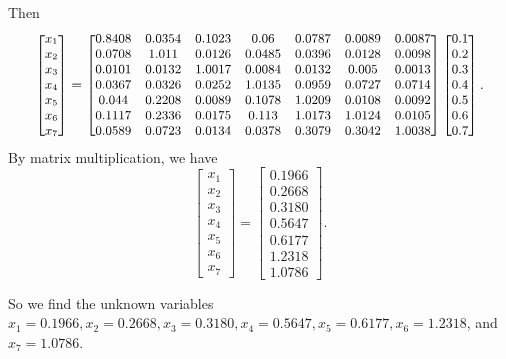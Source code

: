 \begin{example}
Then
\[\small
\begin{bmatrix}
    x_1 \\
    x_2 \\
    x_3 \\
    x_4 \\
    x_5 \\
    x_6 \\
    x_7
\end{bmatrix}
=
\begin{bmatrix}
    0.8408 & 0.0354 & 0.1023 & 0.06 & 0.0787 & 0.0089 & 0.0087 \\
    0.0708 & 1.011 & 0.0126 & 0.0485 & 0.0396 & 0.0128 & 0.0098 \\
    0.0101 & 0.0132 & 1.0017 & 0.0084 & 0.0132 & 0.005 & 0.0013 \\
    0.0367 & 0.0326 & 0.0252 & 1.0135 & 0.0959 & 0.0727 & 0.0714 \\
    0.044 & 0.2208 & 0.0089 & 0.1078 & 1.0209 & 0.0108 & 0.0092 \\
    0.1117 & 0.2336 & 0.0175 & 0.113 & 1.0173 & 1.0124 & 0.0105 \\
    0.0589 & 0.0723 & 0.0134 & 0.0378 & 0.3079 & 0.3042 & 1.0038
\end{bmatrix}
\begin{bmatrix}
    0.1 \\
    0.2 \\
    0.3 \\
    0.4 \\
    0.5 \\
    0.6 \\
    0.7
\end{bmatrix}.
\]
By matrix multiplication, we have
\[ 
\begin{bmatrix}
    x_1 \\
    x_2 \\
    x_3 \\
    x_4 \\
    x_5 \\
    x_6 \\
    x_7
\end{bmatrix}
=
\begin{bmatrix}
    0.1966 \\
    0.2668 \\
    0.3180 \\
    0.5647 \\
    0.6177 \\
    1.2318 \\
    1.0786
\end{bmatrix}.
\]

 So we find the unknown variables
 $x_1 = 0.1966, x_2 = 0.2668, x_3 = 0.3180, x_4 = 0.5647, x_5 = 0.6177, x_6 = 1.2318$, and $x_7 = 1.0786 .$

\end{example}